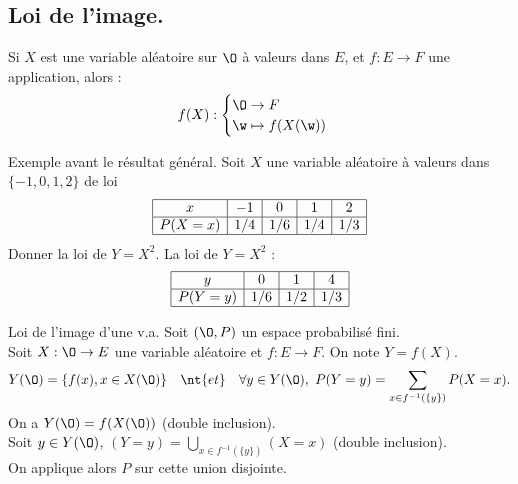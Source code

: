 \documentclass[11pt]{article}
\begin{document}
\subsection{Loi de l'image.}

\indent Si $X$ est une variable aléatoire sur $\O$ à valeurs dans $E$, et $f:E\to F$ une application, alors :
\begin{equation*}
    f(X):\begin{cases}\O\to F\\\w\mapsto f(X(\w))\end{cases}
\end{equation*}

\begin{ex}{Exemple avant le résultat général.}{}
    Soit $X$ une variable aléatoire à valeurs dans $\{-1,0,1,2\}$ de loi
    \begin{eqnarray*}
        \begin{array}{|c|c|c|c|c|}
        \hline
        x&-1&0&1&2\\
        \hline
        P(X=x)&1/4&1/6&1/4&1/3\\
        \hline
        \end{array}
    \end{eqnarray*}
    Donner la loi de $Y=X^2$.
    \tcblower
    La loi de $Y=X^2$ :
    \begin{eqnarray*}
        \begin{array}{|c|c|c|c|c|}
            \hline
            y&0&1&4\\
            \hline
            P(Y=y)&1/6&1/2&1/3\\
            \hline
        \end{array}
    \end{eqnarray*}
\end{ex}

\begin{prop}{Loi de l'image d'une v.a.}{}
    Soit $(\O,P)$ un espace probabilisé fini.\\
    Soit $X:\O\to E$ une variable aléatoire et $f: E\to F$. On note $Y=f(X)$.
    \begin{equation*}
        Y(\O)=\{f(x),x\in X(\O)\} \quad \nt{et} \quad \forall y\in Y(\O), ~ P(Y=y)=\sum_{x\in f^{-1}(\{y\})}P(X=x).
    \end{equation*}
    \tcblower
    On a $Y(\O)=f(X(\O))$ (double inclusion).\\
    Soit $y\in Y(\O)$, $(Y=y)=\bigcup_{x\in f^{-1}(\{y\})}(X=x)$ (double inclusion).\\
    On applique alors $P$ sur cette union disjointe.
\end{prop}
\end{document}
